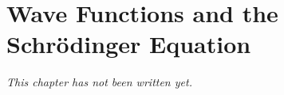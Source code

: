 \chapter{Wave Functions and the Schr\"odinger Equation}\label{ch:b3:schrodinger-equation}


\emph{This chapter has not been written yet.}
